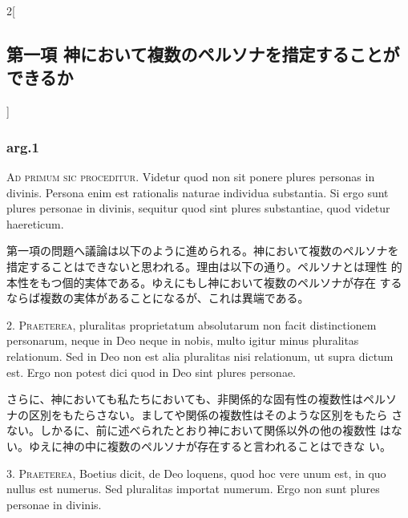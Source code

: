 \documentclass[paper=a4paper,fontsize=10pt,jafontsize=9pt,titlepage]{jlreq}
\begin{document}
\begin{paracol}{2}[\subsection{第一項 神において複数のペルソナを措定することができるか}]

\subsubsection{arg.1}

{\scshape Ad primum sic proceditur}. Videtur quod non sit ponere plures personas
in divinis. Persona enim est rationalis naturae individua
substantia. Si ergo sunt plures personae in divinis, sequitur quod
sint plures substantiae, quod videtur haereticum.


\switchcolumn


第一項の問題へ議論は以下のように進められる。神において複数のペルソナを
 措定することはできないと思われる。理由は以下の通り。ペルソナとは理性
 的本性をもつ個的実体である。ゆえにもし神において複数のペルソナが存在
 するならば複数の実体があることになるが、これは異端である。




2. {\scshape Praeterea}, pluralitas proprietatum absolutarum non facit distinctionem
personarum, neque in Deo neque in nobis, multo igitur minus pluralitas
relationum. Sed in Deo non est alia pluralitas nisi relationum, ut
supra dictum est. Ergo non potest dici quod in Deo sint plures
personae.


\switchcolumn


さらに、神においても私たちにおいても、非関係的な固有性の複数性はペルソ
 ナの区別をもたらさない。ましてや関係の複数性はそのような区別をもたら
 さない。しかるに、前に述べられたとおり神において関係以外の他の複数性
 はない。ゆえに神の中に複数のペルソナが存在すると言われることはできな
 い。




3. {\scshape Praeterea}, Boetius dicit, de Deo loquens, quod hoc vere unum est, in
quo nullus est numerus. Sed pluralitas importat numerum. Ergo non sunt
plures personae in divinis.



\end{paracol}
\end{document}
